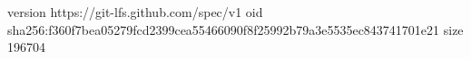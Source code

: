 version https://git-lfs.github.com/spec/v1
oid sha256:f360f7bea05279fcd2399cea55466090f8f25992b79a3e5535ec843741701e21
size 196704
